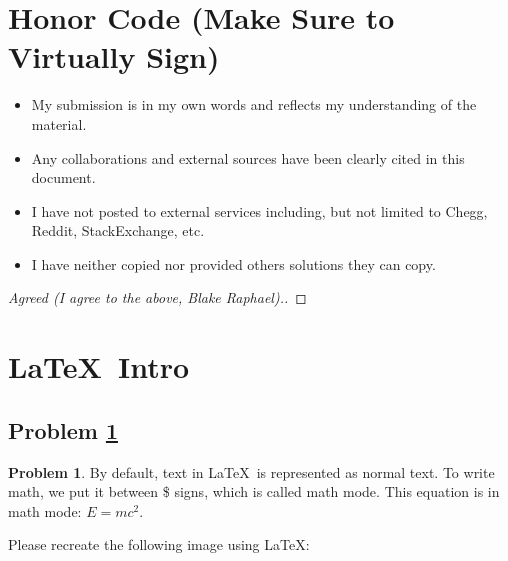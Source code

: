 \documentclass[11pt]{article}
\theoremstyle{definition}
\theoremstyle{definition}
\newtheorem{required}{Problem}
\theoremstyle{definition}
\begin{document}
\section{Honor Code (Make Sure to Virtually Sign)} \label{HonorCode}

\begin{itemize}
\item My submission is in my own words and reflects my understanding of the material.
\item Any collaborations and external sources have been clearly cited in this document.
\item I have not posted to external services including, but not limited to Chegg, Reddit, StackExchange, etc.
\item I have neither copied nor provided others solutions they can copy.
\end{itemize}


\begin{proof}[Agreed (I agree to the above, Blake Raphael).]
\end{proof}


\newpage
\section{\LaTeX\ Intro}

\addtocounter{subsection}{1}

\subsection{Problem \ref{Latex1}}
\begin{required} \label{Latex1}
By default, text in \LaTeX\ is represented as normal text. To write math, we put it between \$ signs, which is called math mode.
This equation is in math mode: $E=mc^2$.

Please recreate the following image using \LaTeX:

\end{required}
\end{document}
